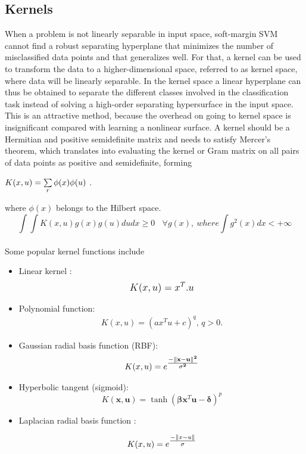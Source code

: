 \subsection{Kernels}

When a problem is not linearly separable in input space, soft-margin SVM cannot find a robust separating
hyperplane that minimizes the number of misclassified data points and that generalizes well. For that, a kernel can be used to transform the data to a higher-dimensional space, referred to as kernel space, where data will be linearly separable. In the kernel space a linear hyperplane can thus be obtained to separate the different classes involved in the classification task instead of solving a high-order separating hypersurface in the input space. This is an attractive method, because the overhead on going to kernel space is insignificant compared with learning a nonlinear surface. A kernel should be a Hermitian and positive semidefinite matrix and needs to satisfy Mercer’s theorem, which translates into evaluating the kernel or Gram matrix on all pairs of data points as positive and semidefinite, forming

$K(\small{x,u})=\sum\limits_{r} \phi(x)\phi(u) $ .

where $\phi(x) $ belongs to the Hilbert space.
\newline
$$\int \int K(x,u) g(x) g(u) du dx \geq 0 \ \ \ \ \forall g(x) , \ where \int g^2(x) dx < +\infty$$
\\
\newline 
Some popular kernel functions include


\begin{itemize}

  \item  Linear kernel  : 
  \begin{align*}
  \mathlarger {K(x,u)=  x^{T}.u  }
   \end{align*}
  \item Polynomial function: 
  \begin{align*}
  K(x,u)=(ax^{T}u + c)^{q} ,\, q>0.
  \end{align*}
  \item Gaussian radial basis function (RBF): 
\begin{align*} 
 K(x,u) = e^{\mathlarger{\frac{\mathbf{-\| x -  u\|^2}}{\mathbf{\sigma^2} } }}
\end{align*}
   
  \item  Hyperbolic tangent (sigmoid):
    \begin{equation}
      K(\mathbf x, \mathbf u) = \tanh(\mathbf {\beta} \mathbf x^{T} \mathbf u - \mathbf{\delta})^p
    \end{equation}
    
    \item Laplacian radial basis function : 
    
    \begin{align*} 
      K(x,u) = e^{\mathlarger{\frac{-\| x -  u\|}{\sigma} } }
     \end{align*}
    
\end{itemize}

